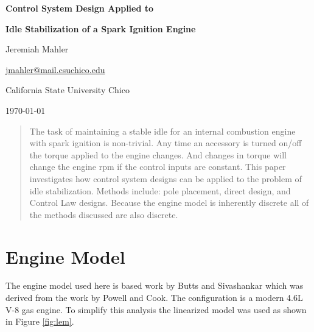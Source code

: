 \documentclass{article}
\begin{document}

\thispagestyle{empty}

\vspace*{1.0in}
\centerline{\Large \textbf{Control System Design Applied to}}
\centerline{\Large \textbf{Idle Stabilization of a Spark Ignition Engine}}
\vspace{0.1in}
\centerline{\normalsize {Jeremiah Mahler}}
\centerline{\small {\href{mailto:jmahler@mail.csuchico.edu}{jmahler@mail.csuchico.edu}} }
\vspace{0.1in}
\centerline{\normalsize {California State University Chico}}
\centerline{\small \today}
\vspace{0.5in}

\vfill

\begin{abstract}
\noindent
The task of maintaining a stable idle for an internal combustion
engine with spark ignition is non-trivial.
Any time an accessory is turned on/off the torque applied to
the engine changes.
And changes in torque will change the engine rpm if the control
inputs are constant.
This paper investigates how control system designs can be applied
to the problem of idle stabilization.
Methods include: pole placement, direct design, and Control Law designs.
Because the engine model is inherently discrete all of the methods
discussed are also discrete.
\end{abstract}

\vspace{1.5in}


\clearpage
\tableofcontents

\clearpage
\section{Engine Model}

The engine model used here is based work
by Butts and Sivashankar\autocite{532315} which was derived from
the work by Powell and Cook\autocite{4789342}.
The configuration is a modern 4.6L V-8 gas engine.
To simplify this analysis the linearized model was used as shown in
Figure \ref{fig:lem}.
\end{document}
